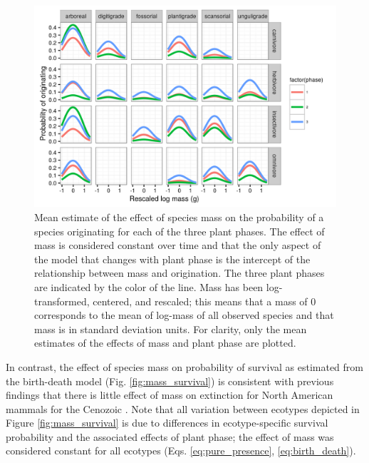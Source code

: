 \documentclass[12pt,letterpaper]{article}
\begin{document}
\begin{figure}[ht]
  \centering
  \includegraphics[width=\textwidth,height=0.4\textheight,keepaspectratio=true]{figure/mass_on_origin_bd}
  \caption[Effect of mass on probability of species origination as estimated from the birth-death model]{Mean estimate of the effect of species mass on the probability of a species originating for each of the three plant phases. The effect of mass is considered constant over time and that the only aspect of the model that changes with plant phase is the intercept of the relationship between mass and origination. The three plant phases are indicated by the color of the line. Mass has been log-transformed, centered, and rescaled; this means that a mass of 0 corresponds to the mean of log-mass of all observed species and that mass is in standard deviation units. For clarity, only the mean estimates of the effects of mass and plant phase are plotted.}
  \label{fig:mass_origin}
\end{figure}

In contrast, the effect of species mass on probability of survival as estimated from the birth-death model (Fig. \ref{fig:mass_survival}) is consistent with previous findings that there is little effect of mass on extinction for North American mammals for the Cenozoic \citep{Smits2015b,Tomiya2013}. Note that all variation between ecotypes depicted in Figure \ref{fig:mass_survival} is due to differences in ecotype-specific survival probability and the associated effects of plant phase; the effect of mass was considered constant for all ecotypes (Eqs. \ref{eq:pure_presence}, \ref{eq:birth_death}).
\end{document}

